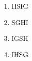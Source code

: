 \documentclass[journal]{IEEEtran}
\begin{document}
\begin{enumerate}
        \begin{multicols}{4}
            \begin{enumerate}
                \item HSIG
                \item SGHI
                \item IGSH
                \item IHSG
            \end{enumerate}
        \end{multicols}

\end{enumerate}
\end{document}
